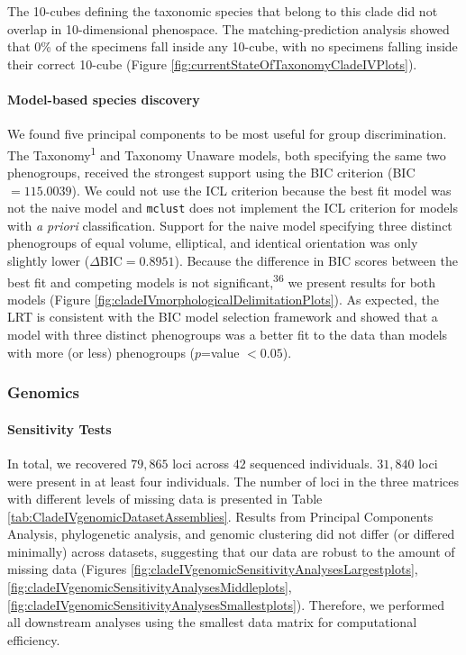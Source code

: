 \documentclass[
  11pt,
]{article}
\begin{document}
The 10-cubes defining the taxonomic species that belong to this clade did not overlap in 10-dimensional phenospace. The matching-prediction analysis showed that \(0\)\% of the specimens fall inside any 10-cube, with no specimens falling inside their correct 10-cube (Figure \ref{fig:currentStateOfTaxonomyCladeIVPlots}).

\hypertarget{model-based-species-discovery-6}{%
\paragraph{Model-based species discovery}\label{model-based-species-discovery-6}}

We found five principal components to be most useful for group discrimination. The Taxonomy\textsuperscript{1} and Taxonomy Unaware models, both specifying the same two phenogroups, received the strongest support using the BIC criterion (BIC\(=115.0039\)). We could not use the ICL criterion because the best fit model was not the naive model and \texttt{mclust} does not implement the ICL criterion for models with \emph{a priori} classification. Support for the naive model specifying three distinct phenogroups of equal volume, elliptical, and identical orientation was only slightly lower (\(\Delta\)BIC\(=0.8951\)). Because the difference in BIC scores between the best fit and competing models is not significant,\textsuperscript{36} we present results for both models (Figure \ref{fig:cladeIVmorphologicalDelimitationPlots}). As expected, the LRT is consistent with the BIC model selection framework and showed that a model with three distinct phenogroups was a better fit to the data than models with more (or less) phenogroups (\(p\)=value \(<0.05\)).

\hypertarget{genomics-4}{%
\subsubsection{Genomics}\label{genomics-4}}

\hypertarget{sensitivity-tests-3}{%
\paragraph{Sensitivity Tests}\label{sensitivity-tests-3}}

In total, we recovered \(79,865\) loci across \(42\) sequenced individuals. \(31,840\) loci were present in at least four individuals. The number of loci in the three matrices with different levels of missing data is presented in Table \ref{tab:CladeIVgenomicDatasetAssemblies}. Results from Principal Components Analysis, phylogenetic analysis, and genomic clustering did not differ (or differed minimally) across datasets, suggesting that our data are robust to the amount of missing data (Figures \ref{fig:cladeIVgenomicSensitivityAnalysesLargestplots}, \ref{fig:cladeIVgenomicSensitivityAnalysesMiddleplots}, \ref{fig:cladeIVgenomicSensitivityAnalysesSmallestplots}). Therefore, we performed all downstream analyses using the smallest data matrix for computational efficiency.
\end{document}
